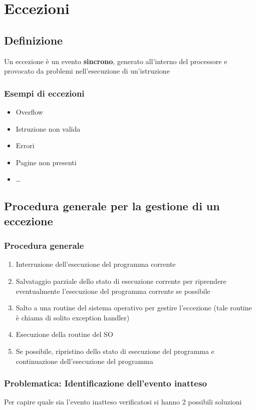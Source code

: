 \chapter{Eccezioni}

\section{Definizione}
Un eccezione è un evento \textbf{sincrono}, generato all'interno del processore e provocato da problemi nell'esecuzione di un'istruzione

\subsection{Esempi di eccezioni}
\begin{itemize}
    \item Overflow
    \item Istruzione non valida
    \item Errori
    \item Pagine non presenti
    \item \dots
\end{itemize}

\section{Procedura generale per la gestione di un eccezione}

\subsection{Procedura generale}
\begin{enumerate}
    \item Interruzione dell'esecuzione del programma corrente
    \item Salvataggio parziale dello stato di esecuzione corrente per riprendere eventualmente l'esecuzione del programma corrente se possibile
    \item Salto a una routine del sistema operativo per gestire l'eccezione (tale routine è chiama di solito exception handler)
    \item Esecuzione della routine del SO
    \item Se possibile, ripristino dello stato di esecuzione del programma e continuazione dell'esecuzione del programma
\end{enumerate}

\subsection{Problematica: Identificazione dell'evento inatteso}
Per capire quale sia l'evento inatteso verificatosi si hanno 2 possibili soluzioni

